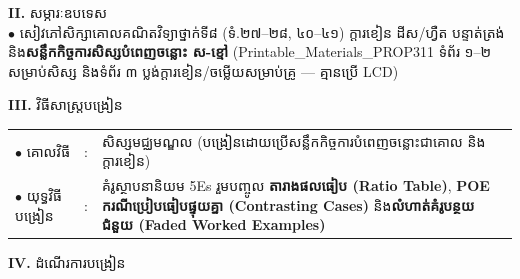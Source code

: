 \documentclass[a4paper,10pt]{article}
\newcommand{\en}[1]{{\TimesEn #1}}
\begin{document}
{\vspace{2pt}

\textbf{II.} {\muol សម្ភារៈឧបទេស}\\[1pt]
\hspace*{0.55cm}$\bullet$ \hspace{0.35cm} សៀវភៅសិក្សាគោលគណិតវិទ្យាថ្នាក់ទី៨ (ទំ.២៧–២៨, ៤០–៤១) ក្ដារខៀន ដីស/ហ្វឺត បន្ទាត់ត្រង់ និង\textbf{សន្លឹកកិច្ចការសិស្សបំពេញចន្លោះ ស-ខ្មៅ} (\en{Printable\_Materials\_PROP311} ទំព័រ ១–២ សម្រាប់សិស្ស និងទំព័រ ៣ ប្លង់ក្ដារខៀន/ចម្លើយសម្រាប់គ្រូ — គ្មានប្រើ \en{LCD})

\vspace{2pt}

\textbf{III.} {\muol វិធីសាស្រ្តបង្រៀន}\\[1pt]
\hspace*{0.45cm}%
\begin{tabular}{@{}l l L{14.85cm}@{}}
  $\bullet$ \hspace{0.25cm} គោលវិធី & : & សិស្សមជ្ឈមណ្ឌល (បង្រៀនដោយប្រើសន្លឹកកិច្ចការបំពេញចន្លោះជាគោល និងក្ដារខៀន) \\
  $\bullet$ \hspace{0.25cm} យុទ្ធវិធីបង្រៀន & : & គំរូស្ថាបនានិយម \en{5Es} រួមបញ្ចូល \textbf{តារាងផលធៀប (\en{Ratio Table})}, \textbf{\en{POE} ករណីប្រៀបធៀបផ្ទុយគ្នា (\en{Contrasting Cases})} និង\textbf{លំហាត់គំរូបន្ថយជំនួយ (\en{Faded Worked Examples})} \\
\end{tabular}
}

\vspace{2pt}

\textbf{IV.} {\muol ដំណើរការបង្រៀន}

\vspace{1pt}
\end{document}
